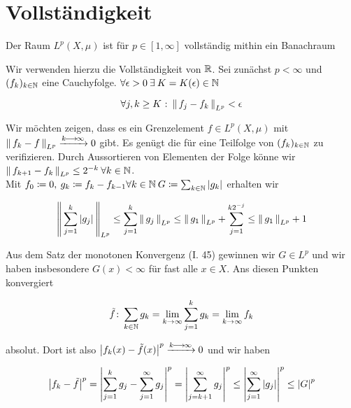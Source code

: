 \documentclass[skript.tex]{subfiles}
\begin{document}
\section{Vollständigkeit}
\begin{theorem}
Der Raum $L^p(X, \mu)$ ist für $p \in [1,\infty]$ vollständig mithin ein Banachraum
\end{theorem}

\begin{bem}
	Wir verwenden hierzu die Vollständigkeit von $\mathbb{R}$. Sei zunächst $p< \infty$ und $(f_k)_{k \in \mathbb{N}}$ eine Cauchyfolge. $\forall \epsilon>0 \: \exists \: K=K(\epsilon) \in \mathbb{N}$
	
	\begin{equation*}
		\forall j,k \geq K \: \colon \left\lVert\, f_j - f_k\, \right\rVert_{L^p} < \epsilon
	\end{equation*}
	
	Wir möchten zeigen, dass es ein Grenzelement $f \in L^p (X, \mu)$ mit $\left\lVert\, f_k - f\, \right\rVert_{L^p} \xrightarrow{k\kern -1pt \longrightarrow \kern -1pt\infty} 0$ gibt. Es genügt die für eine Teilfolge von $(f_k)_{k \in \mathbb{N}}$ zu verifizieren. Durch Aussortieren von Elementen der Folge könne wir $ \left\lVert\, f_{k+1}-f_k\, \right\rVert_{L^p} \leq 2^{-k} \: \forall k\in\mathbb{N}$. \\
	 Mit $f_0 \coloneqq 0, \: g_k \coloneqq f_k - f_{k-1} \forall k \in \mathbb{N} \: G \coloneqq \sum_{k \in \mathbb{N}} \left| g_k \right|$ erhalten wir
	
	\begin{equation*}
	\left\lVert\, \sum_{j=1}^{k} \left| g_j \right|\, \right\rVert_{L^p} \leq \sum_{j=1}^{k} \left\lVert\, g_j\, \right\rVert_{L^p} \leq \left\lVert\, g_1\, \right\rVert_{L^p} + \sum_{j=1}^{k 2^{-j}} \leq \left\lVert\, g_1\, \right\rVert_{L^p} +1
	\end{equation*}
	
	Aus dem Satz der monotonen Konvergenz (I. 45) gewinnen wir $G \in L^p$ und wir haben insbesondere $G(x) < \infty$ für fast alle $x \in X$. Ans diesen Punkten konvergiert
	
	\begin{equation*}
	\tilde f \colon \sum_{k\in \mathbb{N}} g_k = \lim_{ k \to \infty} \sum_{j=1}^{k} g_k = \lim_{k \to \infty} f_k
	\end{equation*}

	absolut. Dort ist also $ \left| f_k(x) - \tilde f(x) \right|^p \xrightarrow{k\kern -1pt \longrightarrow \kern -1pt\infty} 0$ und wir haben
	
	\begin{equation*}
	\left| f_k - \tilde f \right|^p = \left|  \sum_{j=1}^{k} g_j - \sum_{j=1}^{\infty} g_j \right|^p = \left| \sum_{j=k+1}^{\infty} g_j \right|^p \leq \left| \sum_{j=1}^{\infty} \left| g_j \right| \right|^p \leq \left| G \right|^p
	\end{equation*}
	

\end{bem}
\end{document}
